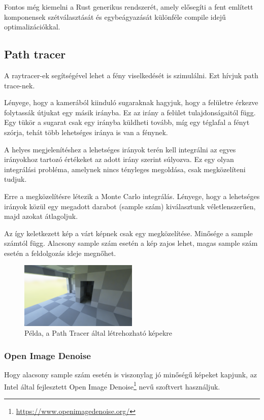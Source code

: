 Fontos még kiemelni a Rust generikus rendszerét, amely elősegíti a fent említett komponensek szétválasztását és egybeágyazását különféle compile idejű optimalizációkkal.

\subsection{Path tracer}
A raytracer-ek segítségével lehet a fény viselkedését is szimulálni. Ezt hívjuk path trace-nek.

Lényege, hogy a kamerából kiinduló sugaraknak hagyjuk, hogy a felületre érkezve folytassák útjukat egy másik irányba. Ez az irány a felület tulajdonságaitól függ. Egy tükör a sugarat csak egy irányba küldheti tovább, míg egy téglafal a fényt szórja, tehát több lehetséges iránya is van a fénynek.

A helyes megjelenítéshez a lehetséges irányok terén kell integrálni az egyes irányokhoz tartozó értékeket az adott irány szerint súlyozva. Ez egy olyan integrálási probléma, amelynek nincs tényleges megoldása, csak megközelíteni tudjuk.

Erre a megközelítésre létezik a Monte Carlo integrálás. Lényege, hogy a lehetséges irányok közül egy megadott darabot (sample szám) kiválasztunk véletlenszerűen, majd azokat átlagoljuk.

Az így keletkezett kép a várt képnek csak egy megközelítése. Minősége a sample számtól függ. Alacsony sample szám esetén a kép zajos lehet, magas sample szám esetén a feldolgozás ideje megnőhet.

\begin{figure}[H]
    \centering
    \includegraphics[width=0.5\textwidth]{parts/developer-documentation/ray-tracer/images/example.png}
    \caption{Példa, a Path Tracer által létrehozható képekre}
\end{figure}

\subsubsection{Open Image Denoise}
Hogy alacsony sample szám esetén is viszonylag jó minőségű képeket kapjunk, az Intel által fejlesztett Open Image Denoise\footnote{\url{https://www.openimagedenoise.org/}} nevű szoftvert használjuk.


